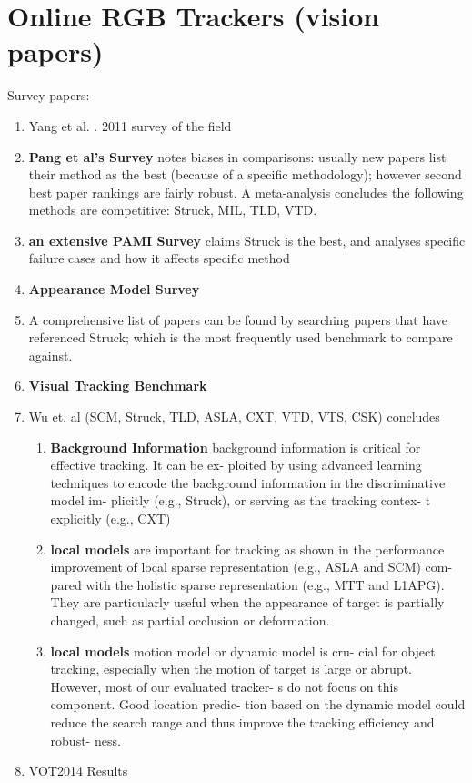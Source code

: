 \section{Online RGB Trackers (vision papers)}
Survey papers:
\begin{enumerate}
\item Yang et al. \cite{yang2011recent}. 2011 survey of the field
\item \textbf{Pang et al's Survey} \cite{pang2013finding} notes biases in
comparisons: usually new papers list their method as the best (because of a
specific methodology); however second best paper rankings are fairly robust. A
meta-analysis concludes the following methods are competitive: Struck, MIL, TLD,
VTD. 
\item \textbf{an extensive PAMI Survey} \cite{smeulders2013visual} claims Struck
is the best, and analyses specific failure cases and how it affects specific
method
\item \textbf{Appearance Model Survey} \cite{li2013survey}
\item A comprehensive list of papers can be found by searching papers that have
referenced Struck; which is the most frequently used benchmark to compare
against.
\item \textbf{Visual Tracking Benchmark}\cite{kristan2013visual} 
\item Wu et. al \cite{wu2013online} (SCM, Struck, TLD, ASLA, CXT, VTD, VTS, CSK)
concludes
    \begin{enumerate}
    \item \textbf{Background Information}  background
    information is critical for effective tracking. It can be ex-
    ploited by using advanced learning techniques to encode
    the background information in the discriminative model im-
    plicitly (e.g., Struck), or serving as the tracking contex-
    t explicitly (e.g., CXT)
    \item \textbf{local models}  are important for tracking as shown in the performance improvement of local sparse representation (e.g., ASLA and SCM) com-
    pared with the holistic sparse representation (e.g., MTT and
    L1APG). They are particularly useful when the appearance
    of target is partially changed, such as partial occlusion or
    deformation.
    \item \textbf{local models} motion model or dynamic model is cru-
    cial for object tracking, especially when the motion of target
    is large or abrupt. However, most of our evaluated tracker-
    s do not focus on this component. Good location predic-
    tion based on the dynamic model could reduce the search
    range and thus improve the tracking efficiency and robust-
    ness.
    \end{enumerate}
\item VOT2014 Results \cite{kristan2014visual}
\end{enumerate}

